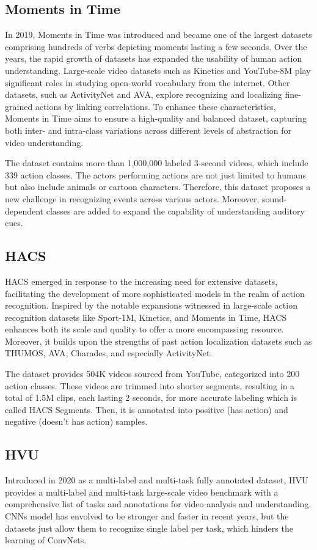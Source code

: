 \documentclass[a4paper]{article}
\begin{document}
\subsection{Moments in Time}
In 2019, Moments in Time was introduced and became one of the largest datasets comprising hundreds of verbs depicting moments lasting a few seconds. Over the years, the rapid growth of datasets has expanded the usability of human action understanding. Large-scale video datasets such as Kinetics and YouTube-8M play significant roles in studying open-world vocabulary from the internet. Other datasets, such as ActivityNet and AVA, explore recognizing and localizing fine-grained actions by linking correlations. To enhance these characteristics, Moments in Time aims to ensure a high-quality and balanced dataset, capturing both inter- and intra-class variations across different levels of abstraction for video understanding.

The dataset contains more than 1,000,000 labeled 3-second videos, which include 339 action classes. The actors performing actions are not just limited to humans but also include animals or cartoon characters. Therefore, this dataset proposes a new challenge in recognizing events across various actors. Moreover, sound-dependent classes are added to expand the capability of understanding auditory cues.
\subsection{HACS}
HACS emerged in response to the increasing need for extensive datasets, facilitating the development of more sophisticated models in the realm of action recognition. Inspired by the notable expansions witnessed in large-scale action recognition datasets like Sport-1M, Kinetics, and Moments in Time, HACS enhances both its scale and quality to offer a more encompassing resource. Moreover, it builds upon the strengths of past action localization datasets such as THUMOS, AVA, Charades, and especially ActivityNet. 

The dataset provides 504K videos sourced from YouTube, categorized into 200 action classes. These videos are trimmed into shorter segments, resulting in a total of 1.5M clips, each lasting 2 seconds, for more accurate labeling which is called HACS Segments. Then, it is annotated into positive (has action) and negative (doesn't has action) samples.
\subsection{HVU}
Introduced in 2020 as a multi-label and multi-task fully annotated dataset, HVU provides a multi-label and multi-task large-scale video benchmark with a comprehensive list of tasks and annotations for video analysis and understanding. CNNs model has envolved to be stronger and faster in recent years, but the datasets just allow them to recognize single label per task, which hinders the learning of ConvNets. 
\end{document}
